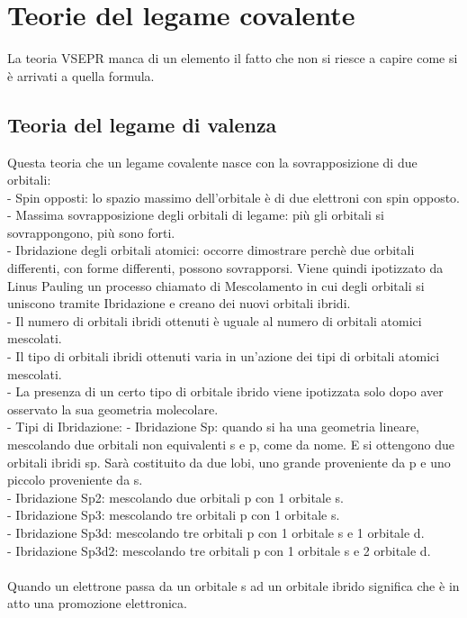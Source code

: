\section{Teorie del legame covalente}
La teoria VSEPR manca di un elemento il fatto che non si riesce a capire come si è arrivati a quella formula.
\subsection{Teoria del legame di valenza}
Questa teoria che un legame covalente nasce con la sovrapposizione di due orbitali:\\
\tab- Spin opposti: lo spazio massimo dell'orbitale è di due elettroni con spin opposto.\\
\tab- Massima sovrapposizione degli orbitali di legame: più gli orbitali si sovrappongono, più sono forti.\\
\tab- Ibridazione degli orbitali atomici: occorre dimostrare perchè due orbitali differenti, con forme differenti, possono sovrapporsi. Viene quindi ipotizzato da Linus Pauling un processo chiamato di Mescolamento in cui degli orbitali si uniscono tramite Ibridazione e creano dei nuovi orbitali ibridi.\\
\tab\tab- Il numero di orbitali ibridi ottenuti è uguale al numero di orbitali atomici mescolati.\\
\tab\tab- Il tipo di orbitali ibridi ottenuti varia in un'azione dei tipi di orbitali atomici mescolati.\\
\tab\tab- La presenza di un certo tipo di orbitale ibrido viene ipotizzata solo dopo aver osservato la sua geometria molecolare.\\
\tab\tab- Tipi di Ibridazione:
\tab\tab\tab- Ibridazione Sp: quando si ha una geometria lineare, mescolando due orbitali non equivalenti s e p, come da nome. E si ottengono due orbitali ibridi sp. Sarà costituito da due lobi, uno grande proveniente da p e uno piccolo proveniente da s.\\
\tab\tab\tab- Ibridazione Sp2: mescolando due orbitali p con 1 orbitale s.\\
\tab\tab\tab- Ibridazione Sp3: mescolando tre orbitali p con 1 orbitale s.\\
\tab\tab\tab- Ibridazione Sp3d: mescolando tre orbitali p con 1 orbitale s e 1 orbitale d.\\
\tab\tab\tab- Ibridazione Sp3d2: mescolando tre orbitali p con 1 orbitale s  e 2 orbitale d.\\\\
Quando un elettrone passa da un orbitale s ad un orbitale ibrido significa che è in atto una promozione elettronica.

